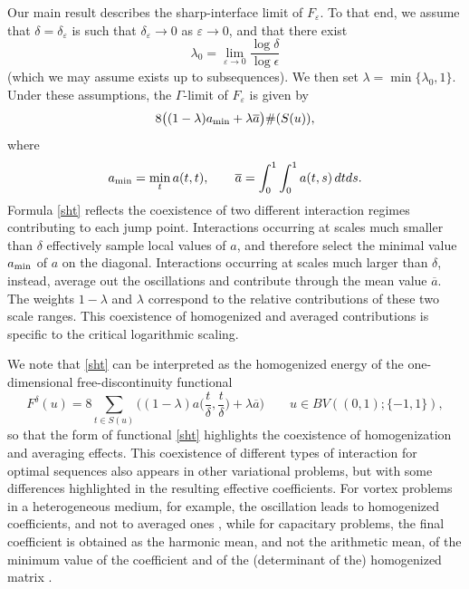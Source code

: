 \documentclass[12pt]{article}
\numberwithin{equation}{section}
\def\e{\varepsilon}
\begin{document}
Our main result describes the sharp-interface limit of $F_\e$.
To that end, we assume that $\delta=\delta_\e$ is such that $\delta_\e\to 0$ as $\e\to 0$, and that there exist
$$
\lambda_0=\lim_{\e\to 0}\frac{\log\delta}{\log\epsilon}
$$
(which we may assume exists up to subsequences). We then set $\lambda=\min\{\lambda_0,1\}$.
Under these assumptions, the $\Gamma$-limit of $F_\e$
is given by 
\begin{equation}\label{sht}
    8\big((1-\lambda)a_{\rm min}+\lambda \overline a\big) \#(S(u)),
\end{equation}
where 
\begin{equation}
    a_{\rm min}=\min_t a(t,t),\qquad
    \overline a=\int_0^1\int_0^1 a(t,s)\,dtds.
\end{equation}
Formula \eqref{sht} reflects the coexistence of two different interaction regimes contributing to each jump point. Interactions occurring at scales much smaller than $\delta$ effectively sample local values of $a$, and therefore select the minimal value $a_{\rm min}$ of $a$ on the diagonal. Interactions occurring at scales much larger than $\delta$, instead, average out the oscillations and contribute through the mean value $\overline{a}$. The weights $1-\lambda$ and $\lambda$ correspond to the relative contributions of these two scale ranges. This coexistence of homogenized and averaged contributions is specific to the critical logarithmic scaling.

We note that \eqref{sht} can be interpreted as the homogenized energy of the one-dimensional free-discontinuity functional
\begin{equation}\label{fsh}
F^\delta(u)=
8\sum_{t\in S(u)} 
\Big((1-\lambda) a
\Big(\frac{t}\delta,\frac{t}\delta\Big)+\lambda \overline a\Big)
\qquad u\in BV((0,1);\{-1,1\}),
\end{equation}
so that the form of functional \eqref{sht} highlights the coexistence of homogenization and averaging effects.
This coexistence of different types of interaction for optimal sequences also appears in other variational problems, but with some differences highlighted in the resulting effective coefficients. For vortex problems in a heterogeneous medium, for example, the oscillation leads to homogenized coefficients, and not to averaged ones \cite{MR4367908}, while for capacitary problems, the final coefficient is obtained as the harmonic mean, and not the arithmetic mean, of the minimum value of the coefficient and of the (determinant of the) homogenized matrix \cite{MR4668552}.
\end{document}
